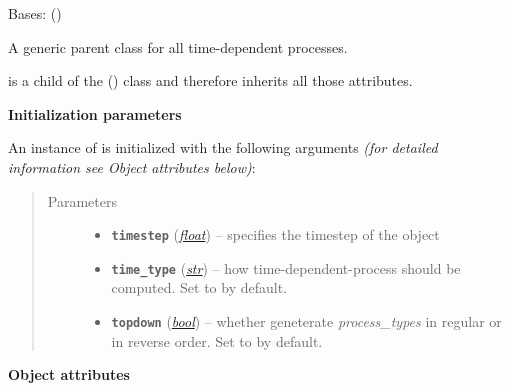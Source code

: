 \documentclass[a4paper,10pt,english]{sphinxmanual}
\begin{document}
\begin{fulllineitems}
\label{api/climlab.process:climlab.process.time_dependent_process.TimeDependentProcess}
Bases: {\hyperref[api/climlab.process:climlab.process.process.Process]{\emph{}}} ()

A generic parent class for all time-dependent processes.

 is a child of the 
{\hyperref[api/climlab.process:climlab.process.process.Process]{\emph{}}} () class and therefore inherits
all those attributes.

\textbf{Initialization parameters}

An instance of  is initialized with the following 
arguments \emph{(for detailed information see Object attributes below)}:
\begin{quote}\begin{description}
\item[{Parameters}] \leavevmode\begin{itemize}
\item {} 
\textbf{\texttt{timestep}} (\href{http://docs.python.org/2.7/library/functions.html\#float}{\emph{float}}) -- specifies the timestep of the object

\item {} 
\textbf{\texttt{time\_type}} (\href{http://docs.python.org/2.7/library/functions.html\#str}{\emph{str}}) -- how time-dependent-process should be computed. 
Set to  by default.

\item {} 
\textbf{\texttt{topdown}} (\href{http://docs.python.org/2.7/library/functions.html\#bool}{\emph{bool}}) -- whether geneterate \emph{process\_types} in regular or 
in reverse order.
Set to  by default.

\end{itemize}

\end{description}\end{quote}

\textbf{Object attributes}


\end{fulllineitems}
\end{document}
